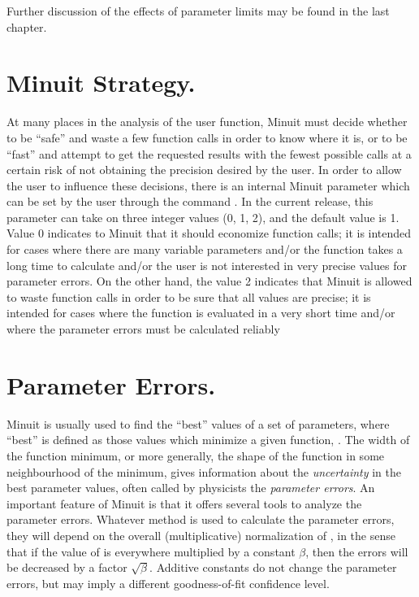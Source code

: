 Further discussion of the effects of parameter limits may be
found in the last chapter.

\section{Minuit Strategy.}

At many places in the analysis of the user function, Minuit must
decide whether to be ``safe'' and waste a few function calls in order
to know where it is, or to be ``fast'' and attempt to get the requested
results with the fewest possible calls at a certain risk of not
obtaining the precision desired by the user.
In order to allow the user to influence these decisions, there is an
internal Minuit parameter  which can be set by the user
through the command .  
In the current release,
this parameter can take on three integer values (0, 1, 2), and the
default value is 1.  Value 0 indicates to Minuit that it should
economize function calls; it is intended for cases where there are
many variable parameters and/or the function takes a long time
to calculate and/or the user is not interested in very precise
values for parameter errors.  On the other hand, the value 2 indicates
that Minuit is allowed to waste function calls in order to be sure
that all values are precise; it is intended for cases where the function
is evaluated in a very short time and/or where the parameter errors
must be calculated reliably

\section{Parameter Errors.}

Minuit is usually used to find the ``best'' values of a set of parameters,
where ``best'' is defined as those values which minimize a given function, .
The width of the function minimum, or more generally, the shape of the
function in some neighbourhood of the minimum, gives information about
the {\it uncertainty} in the best parameter values, often called by
physicists the {\it parameter errors}.
An important feature of Minuit is that it offers several tools to analyze
the parameter errors.
Whatever method is used to calculate the parameter errors, they will depend
on the overall (multiplicative) normalization of , in the sense that if
the value of  is everywhere multiplied by a constant $\beta$, then the errors
will be decreased by a factor $\sqrt{\beta}$.
Additive constants do not change the parameter
errors, but may imply a different goodness-of-fit confidence level.
 
